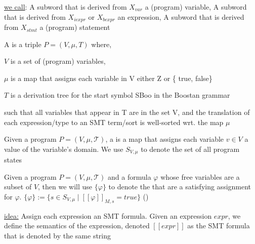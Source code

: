 \documentclass[landscape, a4paper]{article}
\begin{document}
\begin{minipage}[t]{0.2\linewidth}
\begin{betterlist}
		\begin{betterlist}
			\item \underline{we call}: A subword that is derived from $X_{var}$ a (program) \alert{variable}, A subword that is derived from $X_{iexpr}$ or $X_{bexpr}$ an \alert{expression}, A subword that is derived from $X_{stmt}$ a (program) \alert{statement}
		\end{betterlist}
	\end{betterlist}
	\begin{betterlist}
  \item \color{orange}A  is a triple $P = (V , \mu , T)$ where,
		\begin{betterlist}
			\item $V$ is a set of (program) variables,
			\item $\mu$  is a map that assigns each variable in V either Z or \{ true, false\}
			\item $T$ is a derivation tree for the start symbol SBoo in the Boostan grammar
		\end{betterlist}
    such that all variables that appear in T are in the set V, and the translation of each expression/type to an SMT term/sort is well-sorted wrt. the map $\mu$\color{black}
		\item {}
		\item {}
    \item \color{orange}Given a program $P = (V , \mu, \mathcal{T})$, a  is a map that assigns each variable $v \in V$ a value of the variable’s domain. We use $S_{V, \mu}$ to denote the set of all program states\color{black}
		\begin{betterlist}
    \item \color{orange}Given a program $P = (V, \mu, \mathcal{T})$ and a formula $\varphi$ whose free variables are a subset of $V$, then we will use $\{\varphi\}$ to denote the  that are a satisfying assignment for $\varphi$. $\{ \varphi \}  := \{ s \in S_{V ,\mu} \mid [[\varphi ]]_{M,s} = true\}$ ()\color{black}
		\end{betterlist}
		\item \script{171}{Semantics of Expressions}
		\begin{betterlist}
			\item \underline{idea:} Assign each expression an SMT formula. Given an expression $expr$, we define the semantics of the expression, denoted $[[expr]]$ as the SMT formula that is denoted by the same string

\end{betterlist}
\end{betterlist}
\end{minipage}
\end{document}
